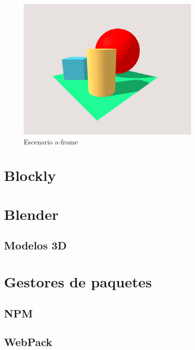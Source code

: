\begin{figure}[htb]
\centering
\includegraphics[width=0.8\textwidth]{img/scene1.png}
\caption{Escenario a-frame} \label{fig:scene1}
\end{figure}


\section{Blockly}
\label{sec:blockly}

\section{Blender}
\label{sec:blender}
\subsection{Modelos 3D}

\section{Gestores de paquetes}
\label{sec:gest}
\subsection{NPM}
\subsection{WebPack}


